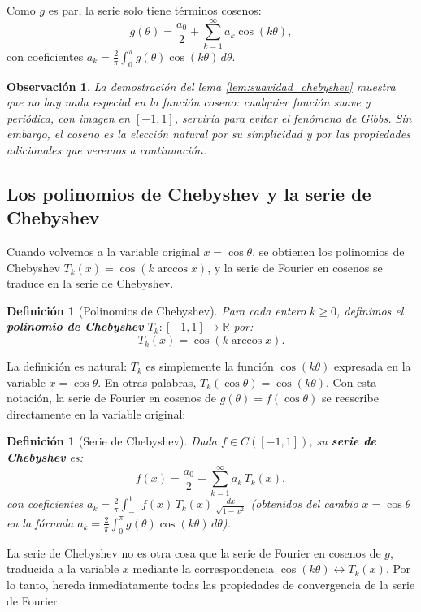 \documentclass[a4paper,11pt]{report}
\newtheorem{definition}[theorem]{Definición}
\newtheorem{remark}[theorem]{Observación}
\begin{document}
Como $g$ es par, la serie solo tiene términos cosenos:
\[
g(\theta) = \frac{a_0}{2} + \sum_{k=1}^\infty a_k \cos(k\theta),
\]
con coeficientes $a_k = \frac{2}{\pi}\int_0^{\pi} g(\theta)\cos(k\theta)\,d\theta$.  

\begin{remark}
La demostración del lema \ref{lem:suavidad_chebyshev} muestra que no hay nada especial en la función coseno: cualquier función suave y periódica, con imagen en $[-1,1]$, serviría para evitar el fenómeno de Gibbs. Sin embargo, el coseno es la elección natural por su simplicidad y por las propiedades adicionales que veremos a continuación.
\end{remark}

\subsection{Los polinomios de Chebyshev y la serie de Chebyshev}

Cuando volvemos a la variable original $x = \cos\theta$, se obtienen los polinomios de Chebyshev $T_k(x) = \cos(k\arccos x)$, y la serie de Fourier en cosenos se traduce en la serie de Chebyshev.

\begin{definition}[Polinomios de Chebyshev]\label{def:chebyshev}
Para cada entero $k \geq 0$, definimos el \textbf{polinomio de Chebyshev} $T_k : [-1,1] \to \mathbb{R}$ por:
\[
T_k(x) = \cos(k\arccos x).
\]
\end{definition}

La definición es natural: $T_k$ es simplemente la función $\cos(k\theta)$ expresada en la variable $x = \cos\theta$.  En otras palabras, $T_k(\cos\theta) = \cos(k\theta)$.  Con esta notación, la serie de Fourier en cosenos de $g(\theta) = f(\cos\theta)$ se reescribe directamente en la variable original:

\begin{definition}[Serie de Chebyshev]\label{def:serie_chebyshev}
Dada $f \in C([-1,1])$, su \textbf{serie de Chebyshev} es:
\[
f(x) = \frac{a_0}{2} + \sum_{k=1}^\infty a_k\, T_k(x),
\]
con coeficientes $a_k = \frac{2}{\pi}\int_{-1}^{1} f(x)\,T_k(x)\,\frac{dx}{\sqrt{1-x^2}}$ (obtenidos del cambio $x = \cos\theta$ en la fórmula $a_k = \frac{2}{\pi}\int_0^\pi g(\theta)\cos(k\theta)\,d\theta$).
\end{definition}

La serie de Chebyshev no es otra cosa que la serie de Fourier en cosenos de $g$, traducida a la variable $x$ mediante la correspondencia $\cos(k\theta) \leftrightarrow T_k(x)$.  Por lo tanto, hereda inmediatamente todas las propiedades de convergencia de la serie de Fourier.
\end{document}
